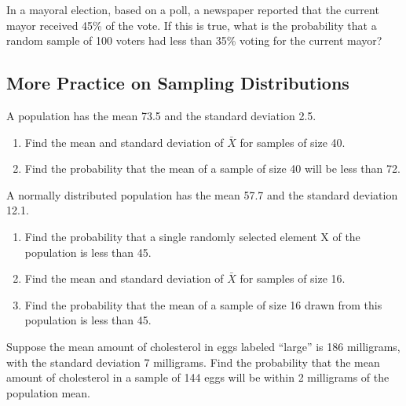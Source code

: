 \begin{exercise}

In a mayoral election, based on a poll, a newspaper reported that the
current mayor received 45\% of the vote. If this is true, what is the
probability that a random sample of 100 voters had less than 35\% voting
for the current mayor?

\end{exercise}

\vspace*{6\baselineskip}

\hypertarget{more-practice-on-sampling-distributions}{%
\subsection{More Practice on Sampling
Distributions}\label{more-practice-on-sampling-distributions}}

\begin{exercise}

A population has the mean 73.5 and the standard deviation 2.5.

\begin{enumerate}
\item
  Find the mean and standard deviation of \(\bar{X}\) for samples of
  size 40.
\item
  Find the probability that the mean of a sample of size 40 will be less
  than 72.
\end{enumerate}

\end{exercise}

\begin{exercise}

A normally distributed population has the mean 57.7 and the standard deviation
12.1.

\begin{enumerate}
\item
  Find the probability that a single randomly selected element X of the
  population is less than 45.
\item
  Find the mean and standard deviation of \(\bar{X}\) for samples of
  size 16.
\item
  Find the probability that the mean of a sample of size 16 drawn from
  this population is less than 45.
\end{enumerate}

\end{exercise}

\begin{exercise}

Suppose the mean amount of cholesterol in eggs labeled ``large'' is 186
milligrams, with the standard deviation 7 milligrams. Find the probability
that the mean amount of cholesterol in a sample of 144 eggs will be
within 2 milligrams of the population mean.

\end{exercise}

